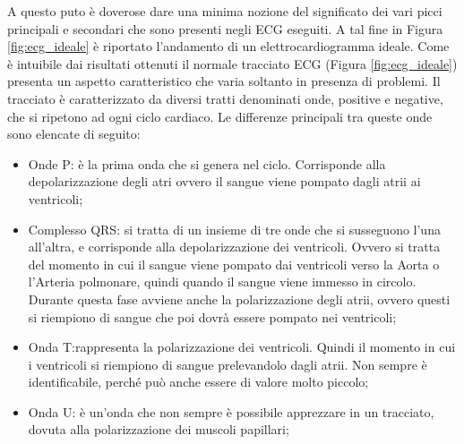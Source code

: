 A questo puto è doverose dare una minima nozione del significato dei vari picci principali e secondari che sono presenti negli ECG eseguiti. A tal fine in Figura \ref{fig:ecg_ideale} è riportato l'andamento di un elettrocardiogramma ideale.
Come è intuibile dai risultati ottenuti il normale tracciato ECG (Figura \ref{fig:ecg_ideale}) presenta un aspetto caratteristico che varia soltanto in presenza di problemi. Il tracciato è caratterizzato da diversi tratti denominati onde, positive e negative, che si ripetono ad ogni ciclo cardiaco.
Le differenze principali tra queste onde sono elencate di seguito:

\begin{itemize} \itemsep0pt \parskip0pt 
	\item{Onde P: è la prima onda che si genera nel ciclo. Corrisponde alla depolarizzazione degli atri ovvero il sangue viene pompato dagli atrii ai ventricoli;}
	\item{Complesso QRS: si tratta di un insieme di tre onde che si susseguono l'una all'altra, e corrisponde alla depolarizzazione dei ventricoli. Ovvero si tratta del momento in cui il sangue viene pompato dai ventricoli verso la Aorta o l'Arteria polmonare, quindi quando il sangue viene immesso in circolo. Durante questa fase avviene anche la polarizzazione degli atrii, ovvero questi si riempiono di sangue che poi dovrà essere pompato nei ventricoli;}
	\item{Onda T:rappresenta la polarizzazione dei ventricoli. Quindi il momento in cui i ventricoli si riempiono di sangue prelevandolo dagli atrii. Non sempre è identificabile, perché può anche essere di valore molto piccolo;}
	\item{Onda U: è un'onda che non sempre è possibile apprezzare in un tracciato, dovuta alla polarizzazione dei muscoli papillari;}
\end{itemize}

